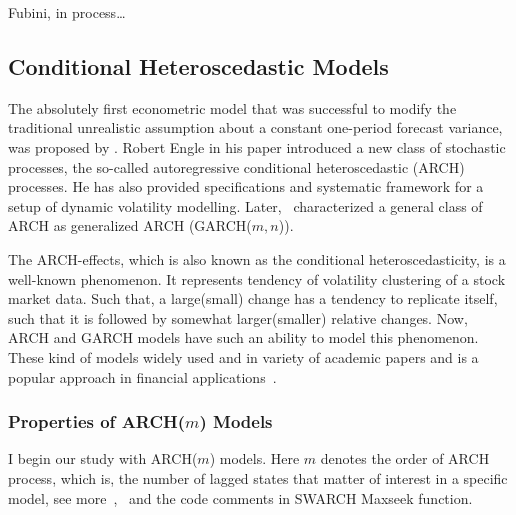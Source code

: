 \documentclass[a4paper,11pt,english]{article}
\begin{document}
			Fubini, in process\ldots
		
		\subsection{Conditional Heteroscedastic Models}
		\label{subsec:arch}

		The absolutely first econometric model that was successful to modify the traditional unrealistic assumption about a constant one-period forecast 
		variance, was proposed by \citep{engle82}. Robert Engle in his paper introduced a new class of stochastic processes, the so-called 
		autoregressive conditional heteroscedastic (ARCH) processes. He has also provided specifications and systematic framework for a setup of dynamic 
		volatility modelling. Later,~\citep{bollerslev} characterized a general class of ARCH as generalized ARCH (GARCH($m,n$)). 
				
		The ARCH-effects, which is also known as the conditional heteroscedasticity, is a well-known phenomenon. It represents tendency of volatility 
		clustering of a stock market data. Such that, a large(small) change has a tendency to replicate itself, such that it is followed by somewhat 
		larger(smaller) relative changes. Now, ARCH and GARCH models have such an ability to model this phenomenon. These kind of models widely used and in 
		variety of academic papers and is a popular approach in financial applications~\citep{canarella}.

						
			\subsubsection{Properties of ARCH($m$) Models}
			
			I begin our study with ARCH($m$) models. Here $m$ denotes the order of ARCH process, which is, the number of lagged states that 
			matter of interest in a specific model, see more~\citep[p.~115, p.~119]{tsay},~\citep[p.~308]{hamiltonsusmel} and the code comments in SWARCH 
			Maxseek function. 
\end{document}

